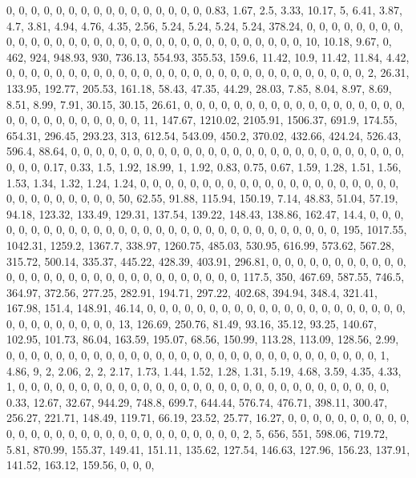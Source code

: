 \documentclass[
]{article}
\begin{document}
0, 0, 0, 0, 0, 0, 0, 0, 0, 0, 0, 0, 0, 0, 0, 0, 0.83, 1.67, 2.5, 3.33,
10.17, 5, 6.41, 3.87, 4.7, 3.81, 4.94, 4.76, 4.35, 2.56, 5.24, 5.24,
5.24, 5.24, 378.24, 0, 0, 0, 0, 0, 0, 0, 0, 0, 0, 0, 0, 0, 0, 0, 0, 0,
0, 0, 0, 0, 0, 0, 0, 0, 0, 0, 0, 0, 0, 0, 0, 10, 10.18, 9.67, 0, 462,
924, 948.93, 930, 736.13, 554.93, 355.53, 159.6, 11.42, 10.9, 11.42,
11.84, 4.42, 0, 0, 0, 0, 0, 0, 0, 0, 0, 0, 0, 0, 0, 0, 0, 0, 0, 0, 0, 0,
0, 0, 0, 0, 0, 0, 0, 0, 0, 2, 26.31, 133.95, 192.77, 205.53, 161.18,
58.43, 47.35, 44.29, 28.03, 7.85, 8.04, 8.97, 8.69, 8.51, 8.99, 7.91,
30.15, 30.15, 26.61, 0, 0, 0, 0, 0, 0, 0, 0, 0, 0, 0, 0, 0, 0, 0, 0, 0,
0, 0, 0, 0, 0, 0, 0, 0, 0, 0, 0, 0, 11, 147.67, 1210.02, 2105.91,
1506.37, 691.9, 174.55, 654.31, 296.45, 293.23, 313, 612.54, 543.09,
450.2, 370.02, 432.66, 424.24, 526.43, 596.4, 88.64, 0, 0, 0, 0, 0, 0,
0, 0, 0, 0, 0, 0, 0, 0, 0, 0, 0, 0, 0, 0, 0, 0, 0, 0, 0, 0, 0, 0, 0, 0,
0.17, 0.33, 1.5, 1.92, 18.99, 1, 1.92, 0.83, 0.75, 0.67, 1.59, 1.28,
1.51, 1.56, 1.53, 1.34, 1.32, 1.24, 1.24, 0, 0, 0, 0, 0, 0, 0, 0, 0, 0,
0, 0, 0, 0, 0, 0, 0, 0, 0, 0, 0, 0, 0, 0, 0, 0, 0, 0, 0, 0, 50, 62.55,
91.88, 115.94, 150.19, 7.14, 48.83, 51.04, 57.19, 94.18, 123.32, 133.49,
129.31, 137.54, 139.22, 148.43, 138.86, 162.47, 14.4, 0, 0, 0, 0, 0, 0,
0, 0, 0, 0, 0, 0, 0, 0, 0, 0, 0, 0, 0, 0, 0, 0, 0, 0, 0, 0, 0, 0, 0, 0,
195, 1017.55, 1042.31, 1259.2, 1367.7, 338.97, 1260.75, 485.03, 530.95,
616.99, 573.62, 567.28, 315.72, 500.14, 335.37, 445.22, 428.39, 403.91,
296.81, 0, 0, 0, 0, 0, 0, 0, 0, 0, 0, 0, 0, 0, 0, 0, 0, 0, 0, 0, 0, 0,
0, 0, 0, 0, 0, 0, 0, 0, 0, 117.5, 350, 467.69, 587.55, 746.5, 364.97,
372.56, 277.25, 282.91, 194.71, 297.22, 402.68, 394.94, 348.4, 321.41,
167.98, 151.4, 148.91, 46.14, 0, 0, 0, 0, 0, 0, 0, 0, 0, 0, 0, 0, 0, 0,
0, 0, 0, 0, 0, 0, 0, 0, 0, 0, 0, 0, 0, 0, 0, 0, 13, 126.69, 250.76,
81.49, 93.16, 35.12, 93.25, 140.67, 102.95, 101.73, 86.04, 163.59,
195.07, 68.56, 150.99, 113.28, 113.09, 128.56, 2.99, 0, 0, 0, 0, 0, 0,
0, 0, 0, 0, 0, 0, 0, 0, 0, 0, 0, 0, 0, 0, 0, 0, 0, 0, 0, 0, 0, 0, 0, 0,
1, 4.86, 9, 2, 2.06, 2, 2, 2.17, 1.73, 1.44, 1.52, 1.28, 1.31, 5.19,
4.68, 3.59, 4.35, 4.33, 1, 0, 0, 0, 0, 0, 0, 0, 0, 0, 0, 0, 0, 0, 0, 0,
0, 0, 0, 0, 0, 0, 0, 0, 0, 0, 0, 0, 0, 0, 0, 0.33, 12.67, 32.67, 944.29,
748.8, 699.7, 644.44, 576.74, 476.71, 398.11, 300.47, 256.27, 221.71,
148.49, 119.71, 66.19, 23.52, 25.77, 16.27, 0, 0, 0, 0, 0, 0, 0, 0, 0,
0, 0, 0, 0, 0, 0, 0, 0, 0, 0, 0, 0, 0, 0, 0, 0, 0, 0, 0, 0, 2, 5, 656,
551, 598.06, 719.72, 5.81, 870.99, 155.37, 149.41, 151.11, 135.62,
127.54, 146.63, 127.96, 156.23, 137.91, 141.52, 163.12, 159.56, 0, 0, 0,
\end{document}
